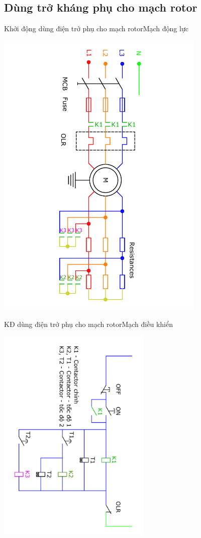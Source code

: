 \documentclass[17pt]{beamer}
\begin{document}
\subsection*{Dùng trở kháng phụ cho mạch rotor}
\begin{frame}{Khởi động dùng điện trở phụ cho mạch rotor}{Mạch động lực}
\vspace{-3cm}
\begin{center}
\includegraphics[width = 0.75\textwidth,angle=90]{../sodomach/sodomach-bc-chude1-5.pdf}
\end{center}
\end{frame}

\begin{frame}{KĐ dùng điện trở phụ cho mạch rotor}{Mạch điều khiển}
\vspace{-1cm}
\begin{center}
\includegraphics[width = 0.55\textwidth,angle=90]{../sodomach/sodomach-bc-chude1-51.pdf}
\end{center}
\end{frame}
\end{document}
